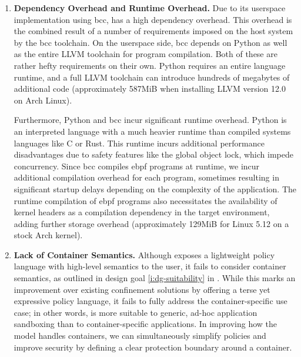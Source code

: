 \begin{enumerate}
  \item \textbf{Dependency Overhead and Runtime Overhead.}
    Due to its userspace implementation using bcc, \bpfbox{} has a high dependency
    overhead. This overhead is the combined result of a number of requirements imposed on
    the host system by the bcc toolchain. On the userspace side, bcc depends on Python as
    well as the entire LLVM toolchain for program compilation. Both of these are rather
    hefty requirements on their own. Python requires an entire language runtime, and
    a full LLVM toolchain can introduce hundreds of megabytes of additional code
    (approximately 587MiB when installing LLVM version 12.0 on Arch Linux).

    Furthermore, Python and bcc incur significant runtime overhead. Python is an
    interpreted language with a much heavier runtime than compiled systems languages like
    C or Rust.  This runtime incurs additional performance disadvantages due to safety
    features like the global object lock, which impede concurrency. Since bcc compiles
    \gls{ebpf} programs at runtime, we incur additional compilation overhead for each
    program, sometimes resulting in significant startup delays depending on the complexity
    of the application. The runtime compilation of \gls{ebpf} programs also necessitates
    the availability of kernel headers as a compilation dependency in the target
    environment, adding further storage overhead (approximately 129MiB for Linux
    5.12 on a stock Arch kernel).

  \item \textbf{Lack of Container Semantics.}
    Although \bpfbox{} exposes a lightweight policy language with high-level semantics to
    the user, it fails to consider container semantics, as outlined in design goal
    \ref{i:dg-suitability} in . While this marks an improvement over
    existing confinement solutions by offering a terse yet expressive policy language, it
    fails to fully address the container-specific use case; in other words, \bpfbox{} is
    more suitable to generic, ad-hoc application sandboxing than to container-specific
    applications. In improving how the \bpfbox{} model handles containers, we can
    simultaneously simplify policies and improve security by defining a clear protection
    boundary around a container.


\end{enumerate}
